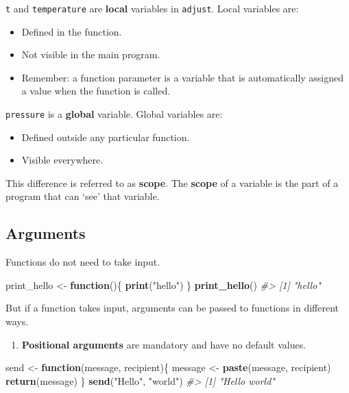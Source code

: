 \documentclass[]{book}
\newenvironment{Shaded}{\begin{snugshade}}{\end{snugshade}}
\newcommand{\CommentTok}[1]{\textcolor[rgb]{0.56,0.35,0.01}{\textit{#1}}}
\newcommand{\ControlFlowTok}[1]{\textcolor[rgb]{0.13,0.29,0.53}{\textbf{#1}}}
\newcommand{\KeywordTok}[1]{\textcolor[rgb]{0.13,0.29,0.53}{\textbf{#1}}}
\newcommand{\NormalTok}[1]{#1}
\newcommand{\StringTok}[1]{\textcolor[rgb]{0.31,0.60,0.02}{#1}}
\providecommand{\tightlist}{%
  \setlength{\itemsep}{0pt}\setlength{\parskip}{0pt}}
\begin{document}
\texttt{t} and \texttt{temperature} are \textbf{local} variables in \texttt{adjust}. Local variables are:

\begin{itemize}
\tightlist
\item
  Defined in the function.
\item
  Not visible in the main program.
\item
  Remember: a function parameter is a variable that is automatically assigned a value when the function is called.
\end{itemize}

\texttt{pressure} is a \textbf{global} variable. Global variables are:

\begin{itemize}
\tightlist
\item
  Defined outside any particular function.
\item
  Visible everywhere.
\end{itemize}

This difference is referred to as \textbf{scope}. The \textbf{scope} of a variable is the part of a program that can `see' that variable.

\hypertarget{arguments-1}{%
\subsection{Arguments}\label{arguments-1}}

Functions do not need to take input.

\begin{Shaded}
\begin{Highlighting}[]
\NormalTok{print_hello <-}\StringTok{ }\ControlFlowTok{function}\NormalTok{()\{}
    \KeywordTok{print}\NormalTok{(}\StringTok{"hello"}\NormalTok{)}
\NormalTok{\}}
\KeywordTok{print_hello}\NormalTok{()}
\CommentTok{#> [1] "hello"}
\end{Highlighting}
\end{Shaded}

But if a function takes input, arguments can be passed to functions in different ways.

\begin{enumerate}
\def\labelenumi{\arabic{enumi})}
\tightlist
\item
  \textbf{Positional arguments} are mandatory and have no default values.
\end{enumerate}

\begin{Shaded}
\begin{Highlighting}[]
\NormalTok{send <-}\StringTok{ }\ControlFlowTok{function}\NormalTok{(message, recipient)\{}
\NormalTok{  message <-}\StringTok{ }\KeywordTok{paste}\NormalTok{(message, recipient)}
  \KeywordTok{return}\NormalTok{(message)}
\NormalTok{\}}
\KeywordTok{send}\NormalTok{(}\StringTok{"Hello"}\NormalTok{, }\StringTok{"world"}\NormalTok{)}
\CommentTok{#> [1] "Hello world"}
\end{Highlighting}
\end{Shaded}
\end{document}
